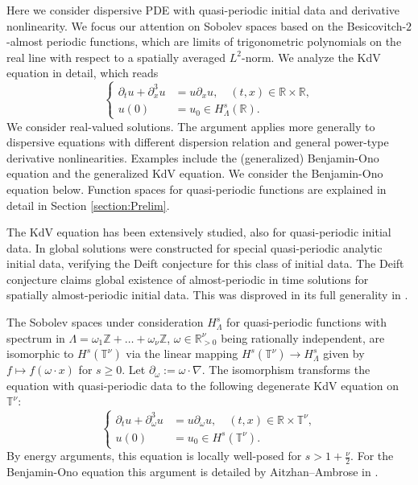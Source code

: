 \documentclass{amsart}
\theoremstyle{definition}
\newcommand{\R}{\mathbb{R}}
\newcommand{\T}{\mathbb{T}}
\newcommand{\Z}{\mathbb{Z}}
\begin{document}
\smallskip

Here we consider dispersive PDE with quasi-periodic initial data and derivative nonlinearity. We focus our attention on Sobolev spaces based on the Besicovitch-$2$-almost periodic functions, which are limits of trigonometric polynomials on the real line with respect to a spatially averaged $L^2$-norm.
We analyze the KdV equation in detail, which reads
\begin{equation}
\label{eq:KdVIntro}
\left\{ \begin{array}{cl}
\partial_t u + \partial_x^3 u &= u \partial_x u, \quad (t,x) \in \R \times \R, \\
u(0) &= u_0 \in H^s_{\Lambda}(\R).
\end{array} \right.
\end{equation}
We consider real-valued solutions. The argument applies more generally to dispersive equations with different dispersion relation and general power-type derivative nonlinearities. Examples include the (generalized) Benjamin-Ono equation and the generalized KdV equation. We consider the Benjamin-Ono equation below.
Function spaces for quasi-periodic functions are explained in detail in Section \ref{section:Prelim}. 

The KdV equation has been extensively studied, also for quasi-periodic initial data. In \cite{BinderDamanikGoldsteinLukic2018} global solutions were constructed for special quasi-periodic analytic initial data, verifying the Deift conjecture for this class of initial data. The Deift conjecture claims global existence of almost-periodic in time solutions for spatially almost-periodic initial data. This was disproved in its full generality in \cite{ChapoutoKillipVisan2024}.

The Sobolev spaces under consideration $H^s_{\Lambda}$ for quasi-periodic functions with spectrum in $\Lambda= \omega_1 \Z + \ldots + \omega_{\nu} \Z$, $\omega \in \R_{>0}^{\nu}$ being rationally independent, are isomorphic to $H^s(\T^{\nu})$ via the linear mapping $H^s(\T^{\nu}) \to H^s_{\Lambda}$ given by $f \mapsto f(\omega \cdot x)$ for $s \geq 0$. Let $\partial_{\omega} := \omega \cdot \nabla $. The isomorphism transforms the equation with quasi-periodic data to the following degenerate KdV equation on $\T^{\nu}$:
\begin{equation}
\label{eq:DegenerateKdVIntro}
\left\{ \begin{array}{cl}
\partial_t u + \partial_{\omega}^3 u &= u \partial_{\omega} u, \quad (t,x) \in \R \times \T^{\nu}, \\
u(0) &= u_0 \in H^s(\T^{\nu}).
\end{array} \right.
\end{equation}
By energy arguments, this equation is locally well-posed for $s>1+\frac{\nu}{2}$. For the Benjamin-Ono equation this argument is detailed by Aitzhan--Ambrose in \cite{AitzhanAmbrose2024}.
\end{document}
